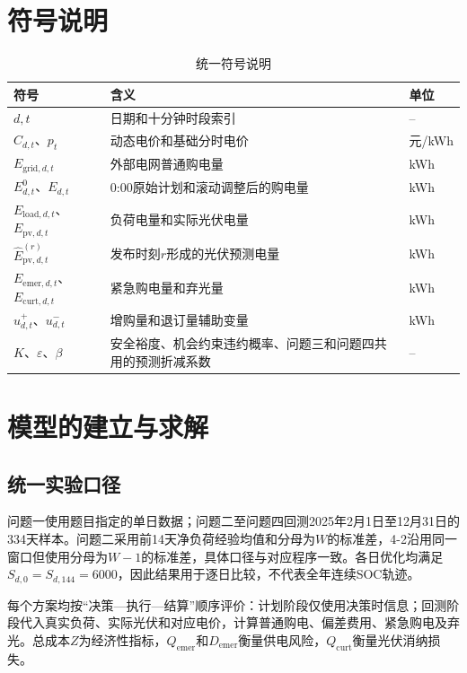 \documentclass{cumcmthesis}
\begin{document}
\section{符号说明}

\begin{table}[H]
\centering
\renewcommand\arraystretch{1.2}
\caption{统一符号说明}
\label{tab:symbols}
\begin{tabular}{p{3.5cm}p{7.3cm}p{2.0cm}}
\toprule
\textbf{符号} & \textbf{含义} & \textbf{单位}\\
\midrule
$d,t$ & 日期和十分钟时段索引 & --\\
$C_{d,t}$、$p_t$ & 动态电价和基础分时电价 & 元/kWh\\
$E_{\mathrm{grid},d,t}$ & 外部电网普通购电量 & kWh\\
$E^0_{d,t}$、$E_{d,t}$ & 0:00原始计划和滚动调整后的购电量 & kWh\\
$E_{\mathrm{load},d,t}$、$E_{\mathrm{pv},d,t}$ & 负荷电量和实际光伏电量 & kWh\\
$\widehat E^{(r)}_{\mathrm{pv},d,t}$ & 发布时刻$r$形成的光伏预测电量 & kWh\\
$E_{\mathrm{emer},d,t}$、$E_{\mathrm{curt},d,t}$ & 紧急购电量和弃光量 & kWh\\
$u^+_{d,t}$、$u^-_{d,t}$ & 增购量和退订量辅助变量 & kWh\\
$K$、$\varepsilon$、$\beta$ & 安全裕度、机会约束违约概率、问题三和问题四共用的预测折减系数 & --\\
\bottomrule
\end{tabular}
\end{table}

\section{模型的建立与求解}

\subsection{统一实验口径}

问题一使用题目指定的单日数据；问题二至问题四回测2025年2月1日至12月31日的334天样本。问题二采用前14天净负荷经验均值和分母为$W$的标准差，4-2沿用同一窗口但使用分母为$W-1$的标准差，具体口径与对应程序一致。各日优化均满足$S_{d,0}=S_{d,144}=6000$，因此结果用于逐日比较，不代表全年连续SOC轨迹。

每个方案均按“决策—执行—结算”顺序评价：计划阶段仅使用决策时信息；回测阶段代入真实负荷、实际光伏和对应电价，计算普通购电、偏差费用、紧急购电及弃光。总成本$Z$为经济性指标，$Q_{\mathrm{emer}}$和$D_{\mathrm{emer}}$衡量供电风险，$Q_{\mathrm{curt}}$衡量光伏消纳损失。
\end{document}
